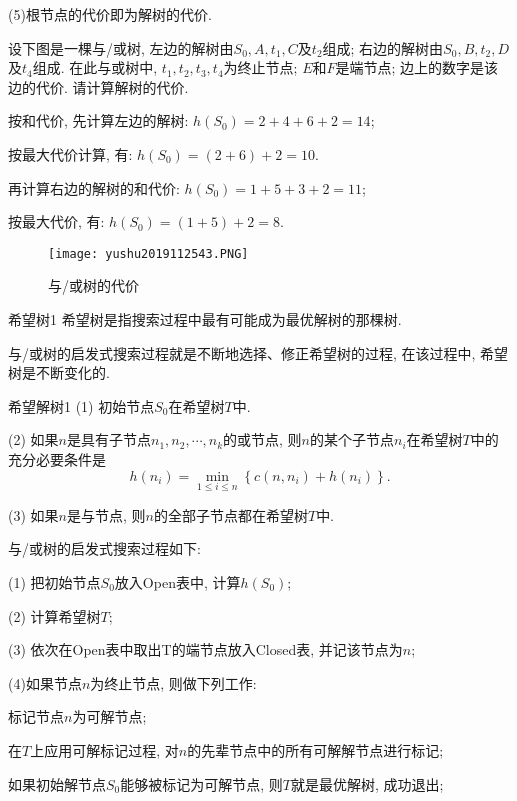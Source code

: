 (5)根节点的代价即为解树的代价.
\begin{example}
    设下图是一棵与/或树, 左边的解树由$S_0,A,t_1,C$及$t_2$组成; 右边的解树由$S_0,B,t_2,D$及$t_4$组成. 在此与或树中, $t_1,t_2,t_3,t_4$为终止节点; $E$和$F$是端节点; 边上的数字是该边的代价. 请计算解树的代价.
\end{example}
\begin{result}
按和代价, 先计算左边的解树: $h(S_0)=2+4+6+2=14$;

按最大代价计算, 有: $h(S_0)=(2+6)+2=10$.

再计算右边的解树的和代价: $h(S_0)=1+5+3+2=11$;

按最大代价, 有: $h(S_0)=(1+5)+2=8$.
\begin{figure}[H]
\centering
\texttt{[image: yushu2019112543.PNG]}
\caption{与/或树的代价}
\label{AI32fig43}
\end{figure}
\end{result}
\begin{mydef}{希望树}{1}
    希望树是指搜索过程中最有可能成为最优解树的那棵树.
\end{mydef}

与/或树的启发式搜索过程就是不断地选择、修正希望树的过程, 在该过程中, 希望树是不断变化的.
\begin{mydef}{希望解树}{1}
(1) 初始节点$S_0$在希望树$T$中.

(2) 如果$n$是具有子节点$n_1, n_2,\cdots, n_k$的或节点, 则$n$的某个子节点$n_i$在希望树$T$中的充分必要条件是
     $$h\left(n_{i}\right)=\min _{1 \leq i \leq n}\left\{c\left(n, n_{i}\right)+h\left(n_{i}\right)\right\}.$$

(3) 如果$n$是与节点, 则$n$的全部子节点都在希望树$T$中.
\end{mydef}

与/或树的启发式搜索过程如下:

(1) 把初始节点$S_0$放入Open表中, 计算$h(S_0)$;

(2) 计算希望树$T$;

(3) 依次在Open表中取出T的端节点放入Closed表, 并记该节点为$n$;

(4)如果节点$n$为终止节点, 则做下列工作:

    标记节点$n$为可解节点;

     在$T$上应用可解标记过程, 对$n$的先辈节点中的所有可解解节点进行标记;

     如果初始解节点$S_0$能够被标记为可解节点, 则$T$就是最优解树, 成功退出;


